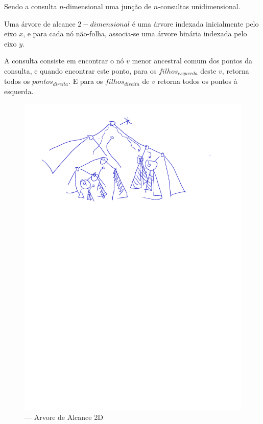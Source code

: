 Sendo a consulta $n$-dimensional uma junção de $n$-consultas unidimensional.

Uma árvore de alcance $2-dimensional$ é uma árvore indexada inicialmente pelo eixo $x$, e para cada
nó não-folha, associa-se uma árvore binária indexada pelo eixo $y$.

A consulta consiste em encontrar o nó $v$ menor ancestral comum dos pontos da consulta, e quando encontrar este
ponto, para os $filhos_{esquerda}$ deste $v$, retorna todos os $pontos_{direita}$. E para os $filhos_{direita}$
de $v$ retorna todos os pontos à esquerda.

\begin{figure}[htb]
    \caption{\label{fig:Fig_6} — Arvore de Alcance 2D}
    \begin{center}
        \includegraphics{images/range_tree.pdf}
    \end{center}
\end{figure}


